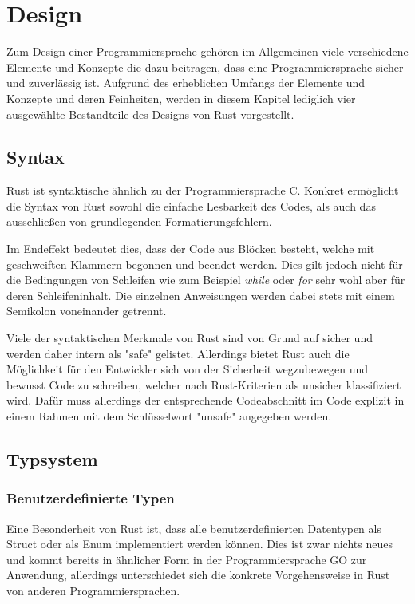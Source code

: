 \newenvironment{code}{\captionsetup{type=listing}}{}
\chapter{Design}
Zum Design einer Programmiersprache gehören im Allgemeinen viele verschiedene Elemente und Konzepte die dazu beitragen, dass eine Programmiersprache sicher und zuverlässig ist. Aufgrund des erheblichen Umfangs der Elemente und Konzepte und deren Feinheiten, werden in diesem Kapitel lediglich vier ausgewählte Bestandteile des Designs von Rust vorgestellt. 

\section{Syntax}
Rust ist syntaktische ähnlich zu der Programmiersprache C. Konkret ermöglicht die Syntax von Rust sowohl die einfache Lesbarkeit des Codes, als auch das ausschließen von grundlegenden Formatierungsfehlern. \autocite{rust-the-book}

Im Endeffekt bedeutet dies, dass der Code aus Blöcken besteht, welche mit geschweiften Klammern begonnen und beendet werden. Dies gilt jedoch nicht für die Bedingungen von Schleifen wie zum Beispiel \textit{while} oder \textit{for} sehr wohl aber für deren Schleifeninhalt. Die einzelnen Anweisungen werden dabei stets mit einem Semikolon voneinander getrennt.  \autocite{rust-the-book}\autocite{rust-by-example}\autocite{rust-wiki}

Viele der syntaktischen Merkmale von Rust sind von Grund auf sicher und werden daher intern als "safe" gelistet. Allerdings bietet Rust auch die Möglichkeit für den Entwickler sich von der Sicherheit wegzubewegen und bewusst Code zu schreiben, welcher nach Rust-Kriterien als unsicher klassifiziert wird. Dafür muss allerdings der entsprechende Codeabschnitt im Code explizit in einem Rahmen mit dem Schlüsselwort "unsafe" angegeben werden.\autocite{rust-the-book}\autocite{rust-by-example}\autocite{rust-wiki}

\section{Typsystem}
\subsection{Benutzerdefinierte Typen}
Eine Besonderheit von Rust ist, dass alle benutzerdefinierten Datentypen als Struct oder als Enum implementiert werden können. Dies ist zwar nichts neues und kommt bereits in ähnlicher Form in der Programmiersprache GO zur Anwendung, allerdings unterschiedet sich die konkrete Vorgehensweise in Rust von anderen Programmiersprachen.

